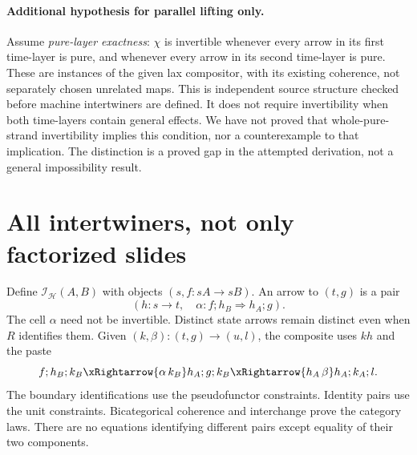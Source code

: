 \documentclass{article}
\begin{document}
\paragraph{Additional hypothesis for parallel lifting only.}
Assume \emph{pure-layer exactness}: $\chi$ is invertible whenever every arrow in its first time-layer is pure, and whenever every arrow in its second time-layer is pure. These are instances of the given lax compositor, with its existing coherence, not separately chosen unrelated maps. This is independent source structure checked before machine intertwiners are defined. It does not require invertibility when both time-layers contain general effects. We have not proved that whole-pure-strand invertibility implies this condition, nor a counterexample to that implication. The distinction is a proved gap in the attempted derivation, not a general impossibility result.

\section{All intertwiners, not only factorized slides}
Define $\mathcal I_{\mathcal H}(A,B)$ with objects $(s,f:sA\to sB)$. An arrow to $(t,g)$ is a pair
\[
(h:s\to t,\quad \alpha:f;h_B\Rightarrow h_A;g).
\]
The cell $\alpha$ need not be invertible. Distinct state arrows remain distinct even when $R$ identifies them. Given $(k,\beta):(t,g)\to(u,l)$, the composite uses $kh$ and the paste
\[
f;h_B;k_B\xRightarrow{\alpha\,k_B}h_A;g;k_B
\xRightarrow{h_A\,\beta}h_A;k_A;l.
\]
The boundary identifications use the pseudofunctor constraints. Identity pairs use the unit constraints. Bicategorical coherence and interchange prove the category laws. There are no equations identifying different pairs except equality of their two components.
\end{document}
